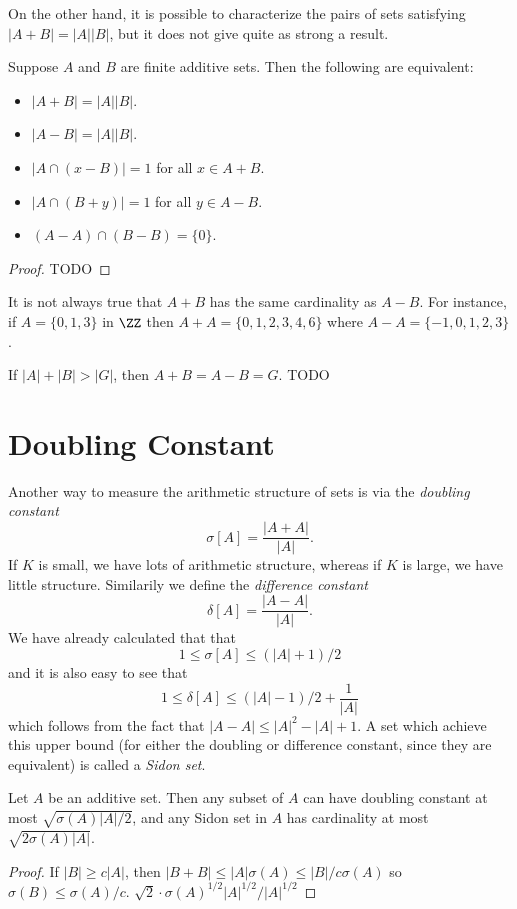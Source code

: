 On the other hand, it is possible to characterize the pairs of sets satisfying $|A + B| = |A| |B|$, but it does not give quite as strong a result.

\begin{theorem}
    Suppose $A$ and $B$ are finite additive sets. Then the following are equivalent:
    \begin{itemize}
        \item $|A + B| = |A||B|$.
        \item $|A - B| = |A||B|$.
        \item $|A \cap (x - B)| = 1$ for all $x \in A + B$.
        \item $|A \cap (B + y)| = 1$ for all $y \in A - B$.
        \item $(A - A) \cap (B - B) = \{ 0 \}$.
    \end{itemize}
\end{theorem}
\begin{proof}
    TODO
\end{proof}

\begin{remark}
    It is not always true that $A + B$ has the same cardinality as $A - B$. For instance, if $A = \{ 0, 1, 3 \}$ in $\ZZ$ then $A + A = \{ 0,1,2,3,4,6 \}$ where $A - A = \{ -1,0,1,2,3 \}$.
\end{remark}

If $|A| + |B| > |G|$, then $A + B = A - B = G$. TODO

\section{Doubling Constant}

Another way to measure the arithmetic structure of sets is via the \emph{doubling constant}
%
\[ \sigma[A] = \frac{|A + A|}{|A|}. \]
%
If $K$ is small, we have lots of arithmetic structure, whereas if $K$ is large, we have little structure. Similarily we define the \emph{difference constant}
%
\[ \delta[A] = \frac{|A - A|}{|A|}. \]
%
We have already calculated that that
%
\[ 1 \leq \sigma[A] \leq (|A| + 1)/2 \]
%
and it is also easy to see that
%
\[ 1 \leq \delta[A] \leq (|A| - 1)/2 + \frac{1}{|A|} \]
%
which follows from the fact that $|A - A| \leq |A|^2 - |A| + 1$. A set which achieve this upper bound (for either the doubling or difference constant, since they are equivalent) is called a \emph{Sidon set}.

\begin{theorem}
    Let $A$ be an additive set. Then any subset of $A$ can have doubling constant at most $\sqrt{\sigma(A)|A|/2}$, and any Sidon set in $A$ has cardinality at most $\sqrt{2\sigma(A) |A|}$.
\end{theorem}
\begin{proof}
    If $|B| \geq c |A|$, then $|B + B| \leq |A| \sigma(A) \leq |B|/c \sigma(A)$ so $\sigma(B) \leq \sigma(A)/c$. $\sqrt{2} \cdot \sigma(A)^{1/2} |A|^{1/2}/|A|^{1/2}$
\end{proof}

